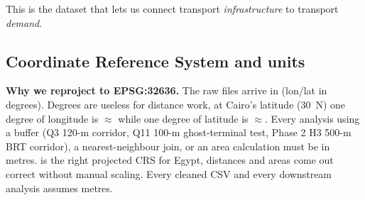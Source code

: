 This is the dataset that lets us connect transport \emph{infrastructure}
to transport \emph{demand}.

\subsection{Coordinate Reference System and units}

\begin{callout}
\textbf{\color{plotblue}Why we reproject to EPSG:32636.}\quad
The raw files arrive in  (lon/lat in degrees). Degrees
are useless for distance work, at Cairo's latitude (30\textdegree~N)
one degree of longitude is $\approx$ while one degree of
latitude is $\approx$. Every analysis using a buffer (Q3
120-m corridor, Q11 100-m ghost-terminal test, Phase 2 H3 500-m BRT
corridor), a nearest-neighbour join, or an area calculation must be in
metres.  is the right projected CRS for Egypt, distances
and areas come out correct without manual scaling. Every cleaned CSV
and every downstream analysis assumes metres.
\end{callout}
